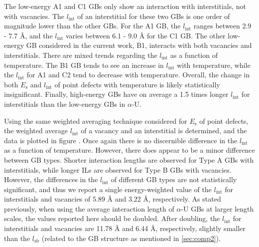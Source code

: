 \documentclass[review]{elsarticle}
\begin{document}
\par The low-energy A1 and C1 GBs only show an interaction with interstitials, not with vacancies. The $l_{\mathrm{int}}$ of an interstitial for these two GBs is one order of magnitude lower than the other GBs. For the A1 GB, the  $l_{\mathrm{int}}$ ranges between 2.9 - 7.7 {\AA}, and the  $l_{\mathrm{int}}$ varies between 6.1 - 9.0 {\AA} for the C1 GB. The other low-energy GB considered in the current work, B1, interacts with both vacancies and interstitials. There are mixed trends regarding the  $l_{\mathrm{int}}$ as a function of temperature. The B1 GB tends to see an increase in  $l_{\mathrm{int}}$ with temperature, while the $l_{\mathrm{int}}$ for A1 and C2 tend to decrease with temperature. Overall, the change in both $E_{\mathrm{s}}$ and  $l_{\mathrm{int}}$ of point defects with temperature is likely statistically insignificant. Finally, high-energy GBs have on average a 1.5 times longer $l_{\mathrm{int}}$ for interstitials than the low-energy GBs in $\alpha$-U.



\par Using the same weighted averaging technique considered for $E_{\mathrm{s}}$ of point defects, the weighted average $l_{\mathrm{int}}$ of a vacancy and an interstitial is determined, and the data is plotted in figure . Once again there is no discernible difference in the  $l_{\mathrm{int}}$ as a function of temperature. However, there does appear to be a minor difference between GB types. Shorter interaction lengths are observed for Type A GBs with interstitials, while longer ILs are observed for Type B GBs with vacancies. However, the differences in the $l_{\mathrm{int}}$ of different GB types are not statistically significant, and thus we report a single energy-weighted value of the $l_{\mathrm{int}}$ for interstitials and vacancies of 5.89 {\AA} and 3.22 {\AA}, respectively. As stated previously, when using the average interaction length of $\alpha$-U GBs at larger length scales, the values reported here should be doubled. After doubling, the $l_{\mathrm{int}}$ for interstitials and vacancies are 11.78 {\AA} and 6.44 {\AA}, respectively, slightly smaller than the $l_{\mathrm{sb}}$ (related to the GB structure as mentioned in \ref{sec:comp2}). 
\end{document}
